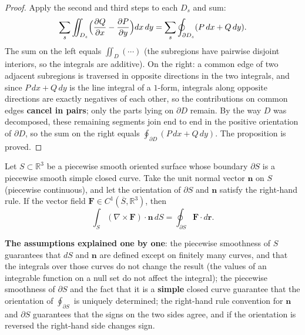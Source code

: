 \begin{proof}
Apply the second and third steps to each $D_s$ and sum:
\[
\sum_s\iint_{D_s}\Bigl(\frac{\partial Q}{\partial x}-\frac{\partial P}{\partial y}\Bigr)dx\,dy = \sum_s\oint_{\partial D_s}(P\,dx+Q\,dy).
\]
The sum on the left equals $\iint_D(\cdots)$ (the subregions have pairwise disjoint interiors, so the integrals are additive). On the right: a common edge of two adjacent subregions is traversed in opposite directions in the two integrals, and since $P\,dx+Q\,dy$ is the line integral of a $1$-form, integrals along opposite directions are exactly negatives of each other, so the contributions on common edges \textbf{cancel in pairs}; only the parts lying on $\partial D$ remain. By the way $D$ was decomposed, these remaining segments join end to end in the positive orientation of $\partial D$, so the sum on the right equals $\oint_{\partial D}(P\,dx+Q\,dy)$. The proposition is proved.
\end{proof}

\begin{theorem}\label{thm:stokes}
Let $S \subset \mathbb{R}^3$ be a piecewise smooth oriented surface whose boundary $\partial S$ is a piecewise smooth simple closed curve. Take the unit normal vector $\mathbf n$ on $S$ (piecewise continuous), and let the orientation of $\partial S$ and $\mathbf n$ satisfy the right-hand rule. If the vector field $\mathbf{F} \in C^1(\overline{S}, \mathbb{R}^3)$, then
\[
\int_S (\nabla \times \mathbf{F}) \cdot \mathbf{n} \, dS = \oint_{\partial S} \mathbf{F} \cdot d\mathbf{r}.
\]

\textbf{The assumptions explained one by one}: the piecewise smoothness of $S$ guarantees that $dS$ and $\mathbf n$ are defined except on finitely many curves, and that the integrals over those curves do not change the result (the values of an integrable function on a null set do not affect the integral); the piecewise smoothness of $\partial S$ and the fact that it is a \textbf{simple} closed curve guarantee that the orientation of $\oint_{\partial S}$ is uniquely determined; the right-hand rule convention for $\mathbf n$ and $\partial S$ guarantees that the signs on the two sides agree, and if the orientation is reversed the right-hand side changes sign.
\end{theorem}

